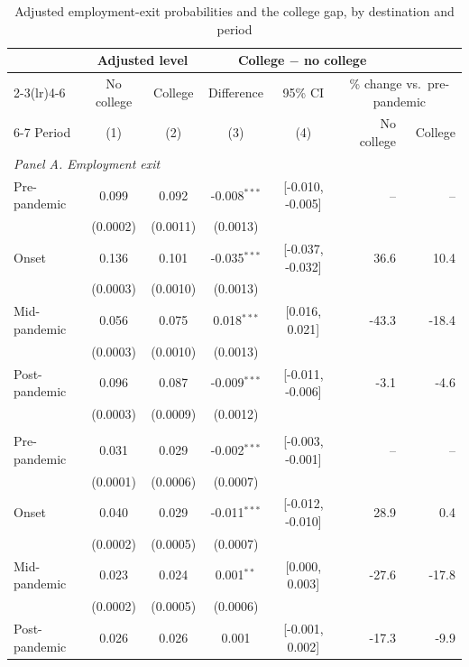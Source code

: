 \begin{table}[H]
\centering
\caption{Adjusted employment-exit probabilities and the college gap, by destination and period}
\label{tab:main_margins}
\begin{threeparttable}
\footnotesize
\renewcommand{\arraystretch}{0.96}
\setlength{\tabcolsep}{4pt}
\begin{tabular}{lccccrr}
\toprule
& \multicolumn{2}{c}{Adjusted level} & \multicolumn{3}{c}{College $-$ no college} & \\
\cmidrule(lr){2-3}\cmidrule(lr){4-6}
& No college & College & Difference & 95\% CI & \multicolumn{2}{c}{\% change vs.\ pre-pandemic} \\
\cmidrule(lr){6-7}
Period & (1) & (2) & (3) & (4) & No college & College \\
\midrule
\multicolumn{7}{l}{\textit{Panel A. Employment exit}} \\
\quad Pre-pandemic & 0.099 & 0.092 & -0.008$^{***}$ & [-0.010, -0.005] & -- & -- \\
 & (0.0002) & (0.0011) & (0.0013) & & & \\
\quad Onset & 0.136 & 0.101 & -0.035$^{***}$ & [-0.037, -0.032] & 36.6 & 10.4 \\
 & (0.0003) & (0.0010) & (0.0013) & & & \\
\quad Mid-pandemic & 0.056 & 0.075 & 0.018$^{***}$ & [0.016, 0.021] & -43.3 & -18.4 \\
 & (0.0003) & (0.0010) & (0.0013) & & & \\
\quad Post-pandemic & 0.096 & 0.087 & -0.009$^{***}$ & [-0.011, -0.006] & -3.1 & -4.6 \\
 & (0.0003) & (0.0009) & (0.0012) & & & \\
\addlinespace
\multicolumn{7}{l}{\textit{Panel B. Exit into unemployment}} \\
\quad Pre-pandemic & 0.031 & 0.029 & -0.002$^{***}$ & [-0.003, -0.001] & -- & -- \\
 & (0.0001) & (0.0006) & (0.0007) & & & \\
\quad Onset & 0.040 & 0.029 & -0.011$^{***}$ & [-0.012, -0.010] & 28.9 & 0.4 \\
 & (0.0002) & (0.0005) & (0.0007) & & & \\
\quad Mid-pandemic & 0.023 & 0.024 & 0.001$^{**}$ & [0.000, 0.003] & -27.6 & -17.8 \\
 & (0.0002) & (0.0005) & (0.0006) & & & \\
\quad Post-pandemic & 0.026 & 0.026 & 0.001 & [-0.001, 0.002] & -17.3 & -9.9 \\

\end{tabular}
\end{threeparttable}
\end{table}

